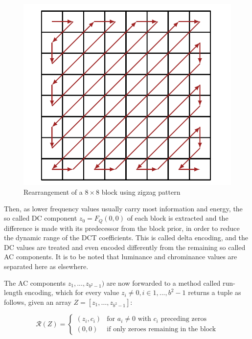 \begin{figure}[H]
	\centering
	\includegraphics[width=0.8\linewidth]{zigzag.png}
	\caption{Rearrangement of a \(8\times8\) block using zigzag pattern}
	\label{fig:zigzag}
\end{figure}

Then, as lower frequency values usually carry most information and energy, the so called DC component \(z_0 = F_Q(0,0)\) of each block is extracted and the difference is made with its predecessor from the block prior, in order to reduce the dynamic range of the DCT coefficients. This is called delta encoding, and the DC values are treated and even encoded differently from the remaining so called AC components. It is to be noted that luminance and chrominance values are separated here as elsewhere.

The AC components \(z_1,...,z_{b^2-1})\) are now forwarded to a method called run-length encoding, which for every value \(z_i \neq 0, i \in {1,...,b^2-1}\) returns a tuple as follows, given an array \(Z = [z_1, \ldots, z_{b^2-1}]\):

\begin{equation*}
	\mathcal{R}(Z) = \begin{cases}
		(z_i, c_i) & \text{for } a_i \neq 0 \text{ with } c_i \text{ preceding zeros} \\
		(0,0) & \text{if only zeroes remaining in the block}
	\end{cases}
\end{equation*}



